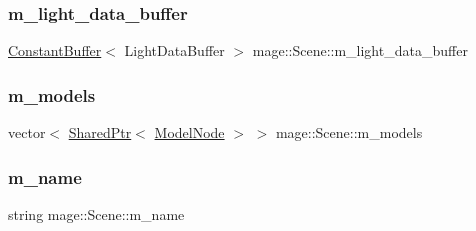 \hypertarget{classmage_1_1_scene_aa74ca1637e0a88546135d64bf3614f29}{}\label{classmage_1_1_scene_aa74ca1637e0a88546135d64bf3614f29} 
\subsubsection{\texorpdfstring{m\+\_\+light\+\_\+data\+\_\+buffer}{m\_light\_data\_buffer}}
{\footnotesize\ttfamily \hyperlink{structmage_1_1_constant_buffer}{Constant\+Buffer}$<$ Light\+Data\+Buffer $>$ mage\+::\+Scene\+::m\+\_\+light\+\_\+data\+\_\+buffer\hspace{0.3cm}{\ttfamily [private]}}

\hypertarget{classmage_1_1_scene_a01132a667fbc1517f11ae561bc221071}{}\label{classmage_1_1_scene_a01132a667fbc1517f11ae561bc221071} 
\subsubsection{\texorpdfstring{m\+\_\+models}{m\_models}}
{\footnotesize\ttfamily vector$<$ \hyperlink{namespacemage_a1e01ae66713838a7a67d30e44c67703e}{Shared\+Ptr}$<$ \hyperlink{classmage_1_1_model_node}{Model\+Node} $>$ $>$ mage\+::\+Scene\+::m\+\_\+models\hspace{0.3cm}{\ttfamily [private]}}

\hypertarget{classmage_1_1_scene_a6cc8cb08b1853c4e3063b33a94e8fb47}{}\label{classmage_1_1_scene_a6cc8cb08b1853c4e3063b33a94e8fb47} 
\subsubsection{\texorpdfstring{m\+\_\+name}{m\_name}}
{\footnotesize\ttfamily string mage\+::\+Scene\+::m\+\_\+name\hspace{0.3cm}{\ttfamily [private]}}

\hypertarget{classmage_1_1_scene_a881c3dd7e85e5069650f29fd2722bf78}{}\label{classmage_1_1_scene_a881c3dd7e85e5069650f29fd2722bf78} 

